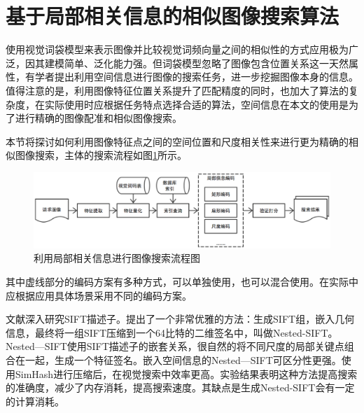 
\section{基于局部相关信息的相似图像搜索算法}

使用视觉词袋模型来表示图像并比较视觉词频向量之间的相似性的方式应用极为广泛，因其建模简单、泛化能力强。但词袋模型忽略了图像包含位置关系这一天然属性，有学者提出利用空间信息进行图像的搜索任务，进一步挖掘图像本身的信息\cite{Philbin:2007fk,Wu:2009bl,Zhou:2010tv,Zhou:2013jz,Xu:2013wc}。值得注意的是，利用图像特征位置关系提升了匹配精度的同时，也加大了算法的复杂度，在实际使用时应根据任务特点选择合适的算法，空间信息在本文的使用是为了进行精确的图像配准和相似图像搜索。

本节将探讨如何利用图像特征点之间的空间位置和尺度相关性来进行更为精确的相似图像搜索，主体的搜索流程如图\ref{fig:similar_flowchar}所示。

\begin{figure}
\centering\includegraphics[width=16cm]{imgs/ch3/similar_flowchart}
\caption{利用局部相关信息进行图像搜索流程图}
\label{fig:similar_flowchar}
\end{figure}

其中虚线部分的编码方案有多种方式，可以单独使用，也可以混合使用。在实际中应根据应用具体场景采用不同的编码方案。

文献\cite{Xu:2013wc}深入研究SIFT描述子。提出了一个非常优雅的方法：生成SIFT组，嵌入几何信息，最终将一组SIFT压缩到一个64比特的二维签名中，叫做Nested-SIFT。Nested—SIFT使用SIFT描述子的嵌套关系，很自然的将不同尺度的局部关键点组合在一起，生成一个特征签名。嵌入空间信息的Nested—SIFT可区分性更强。使用SimHash进行压缩后，在视觉搜索中效率更高。实验结果表明这种方法提高搜索的准确度，减少了内存消耗，提高搜索速度。其缺点是生成Nested-SIFT会有一定的计算消耗。


